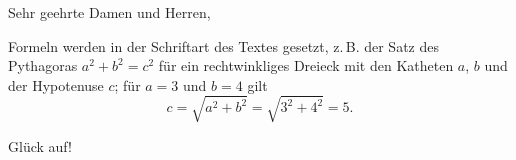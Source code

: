 \documentclass[DElocalization, helvetica, pageNumbersMofN, pageNumbersTemplate]{mul-letter}
\begin{document}

\subject{Betreff}

Sehr geehrte Damen und Herren,

\lipsum[1-3]

Formeln werden in der Schriftart des Textes gesetzt, z.\,B. der Satz des
Pythagoras $a^2 + b^2 = c^2$ für ein rechtwinkliges Dreieck mit den Katheten
$a$, $b$ und der Hypotenuse $c$; für $a = 3$ und $b = 4$ gilt
\[
  c = \sqrt{a^2 + b^2} = \sqrt{3^2 + 4^2} = 5.
\]

\lipsum[4-6]

\closing{Glück auf!}

\end{document}
